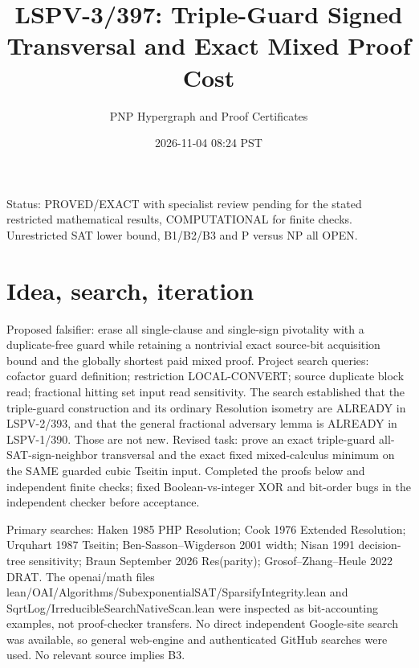 \documentclass[11pt]{article}
\title{LSPV-3/397: Triple-Guard Signed Transversal and Exact Mixed Proof Cost}
\author{PNP Hypergraph and Proof Certificates}
\date{2026-11-04 08:24 PST}
\begin{document}
\maketitle
\noindent Status: PROVED/EXACT with specialist review pending for the stated restricted mathematical results, COMPUTATIONAL for finite checks. Unrestricted SAT lower bound, B1/B2/B3 and P versus NP all OPEN.
\section*{Idea, search, iteration}
Proposed falsifier: erase all single-clause and single-sign pivotality with a duplicate-free guard while retaining a nontrivial exact source-bit acquisition bound and the globally shortest paid mixed proof. Project search queries: cofactor guard definition; restriction LOCAL-CONVERT; source duplicate block read; fractional hitting set input read sensitivity. The search established that the triple-guard construction and its ordinary Resolution isometry are ALREADY in LSPV-2/393, and that the general fractional adversary lemma is ALREADY in LSPV-1/390. Those are not new. Revised task: prove an exact triple-guard all-SAT-sign-neighbor transversal and the exact fixed mixed-calculus minimum on the SAME guarded cubic Tseitin input. Completed the proofs below and independent finite checks; fixed Boolean-vs-integer XOR and bit-order bugs in the independent checker before acceptance.
\par Primary searches: Haken 1985 PHP Resolution; Cook 1976 Extended Resolution; Urquhart 1987 Tseitin; Ben-Sasson--Wigderson 2001 width; Nisan 1991 decision-tree sensitivity; Braun September 2026 Res(parity); Grosof--Zhang--Heule 2022 DRAT. The openai/math files lean/OAI/Algorithms/SubexponentialSAT/SparsifyIntegrity.lean and SqrtLog/IrreducibleSearchNativeScan.lean were inspected as bit-accounting examples, not proof-checker transfers. No direct independent Google-site search was available, so general web-engine and authenticated GitHub searches were used. No relevant source implies B3.
\end{document}
